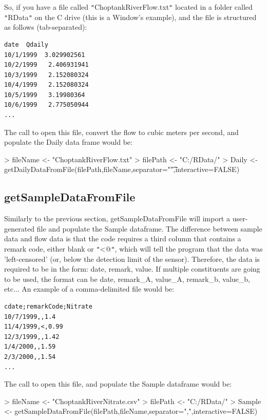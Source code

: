 \documentclass[a4paper,11pt]{article}
\begin{document}
So, if you have a file called \texttt{"}ChoptankRiverFlow.txt\texttt{"} located in a folder called \texttt{"}RData\texttt{"} on the C drive (this is a Window's example), and the file is structured as follows (tab-separated):
\begin{verbatim}
date  Qdaily
10/1/1999  3.029902561
10/2/1999	2.406931941
10/3/1999	2.152080324
10/4/1999	2.152080324
10/5/1999	3.19980364
10/6/1999	2.775050944
...
\end{verbatim}

The call to open this file, convert the flow to cubic meters per second, and populate the Daily data frame would be:
\begin{Schunk}
\begin{Sinput}
> fileName <- "ChoptankRiverFlow.txt"
> filePath <-  "C:/RData/"
> Daily <- getDailyDataFromFile(filePath,fileName,separator="\t",interactive=FALSE)
\end{Sinput}
\end{Schunk}

\subsection{getSampleDataFromFile}
Similarly to the previous section, getSampleDataFromFile will import a user-generated file and populate the Sample dataframe. The difference between sample data and flow data is that the code requires a third column that contains a remark code, either blank or \texttt{"}\verb@<@\texttt{"}, which will tell the program that the data was 'left-censored' (or, below the detection limit of the sensor). Therefore, the data is required to be in the form: date, remark, value.  If multiple constituents are going to be used, the format can be date, remark\_A, value\_A, remark\_b, value\_b, etc... An example of a comma-delimited file would be:

\begin{verbatim}
cdate;remarkCode;Nitrate
10/7/1999,,1.4
11/4/1999,<,0.99
12/3/1999,,1.42
1/4/2000,,1.59
2/3/2000,,1.54
...
\end{verbatim}
The call to open this file, and populate the Sample dataframe would be:
\begin{Schunk}
\begin{Sinput}
> fileName <- "ChoptankRiverNitrate.csv"
> filePath <-  "C:/RData/"
> Sample <- getSampleDataFromFile(filePath,fileName,separator=",",interactive=FALSE)
\end{Sinput}
\end{Schunk}
\end{document}
